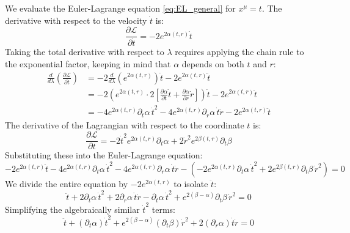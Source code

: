 \documentclass[11pt, a4paper]{report}
\begin{document}
We evaluate the Euler-Lagrange equation \eqref{eq:EL_general} for $x^\mu = t$. 
The derivative with respect to the velocity $\dot{t}$ is:
\begin{equation}
    \frac{\partial \mathcal{L}}{\partial \dot{t}} = -2e^{2\alpha(t,r)} \dot{t}
\end{equation}
Taking the total derivative with respect to $\lambda$ requires applying the chain rule to the exponential factor, keeping in mind that $\alpha$ depends on both $t$ and $r$:
\begin{align}
    \frac{d}{d\lambda} \left( \frac{\partial \mathcal{L}}{\partial \dot{t}} \right) &= -2 \frac{d}{d\lambda} \left( e^{2\alpha(t,r)} \right) \dot{t} - 2e^{2\alpha(t,r)} \ddot{t} \nonumber \\
    &= -2 \left( e^{2\alpha(t,r)} \cdot 2 \left[ \frac{\partial \alpha}{\partial t} \dot{t} + \frac{\partial \alpha}{\partial r} \dot{r} \right] \right) \dot{t} - 2e^{2\alpha(t,r)} \ddot{t} \nonumber \\
    &= -4e^{2\alpha(t,r)} \partial_t \alpha \, \dot{t}^2 - 4e^{2\alpha(t,r)} \partial_r \alpha \, \dot{t}\dot{r} - 2e^{2\alpha(t,r)} \ddot{t}
\end{align}
The derivative of the Lagrangian with respect to the coordinate $t$ is:
\begin{equation}
    \frac{\partial \mathcal{L}}{\partial t} = -2\dot{t}^2 e^{2\alpha(t,r)} \partial_t \alpha + 2\dot{r}^2 e^{2\beta(t,r)} \partial_t \beta
\end{equation}
Substituting these into the Euler-Lagrange equation:
\begin{equation}
    -2e^{2\alpha(t,r)} \ddot{t} - 4e^{2\alpha(t,r)} \partial_t \alpha \, \dot{t}^2 - 4e^{2\alpha(t,r)} \partial_r \alpha \, \dot{t}\dot{r} - \left( -2e^{2\alpha(t,r)} \partial_t \alpha \, \dot{t}^2 + 2e^{2\beta(t,r)} \partial_t \beta \, \dot{r}^2 \right) = 0
\end{equation}
We divide the entire equation by $-2e^{2\alpha(t,r)}$ to isolate $\ddot{t}$:
\begin{equation}
    \ddot{t} + 2\partial_t \alpha \, \dot{t}^2 + 2\partial_r \alpha \, \dot{t}\dot{r} - \partial_t \alpha \, \dot{t}^2 + e^{2(\beta - \alpha)} \partial_t \beta \, \dot{r}^2 = 0
\end{equation}
Simplifying the algebraically similar $\dot{t}^2$ terms:
\begin{equation}
    \ddot{t} + (\partial_t \alpha) \dot{t}^2 + e^{2(\beta - \alpha)} (\partial_t \beta) \dot{r}^2 + 2 (\partial_r \alpha) \dot{t}\dot{r} = 0 \label{eq:geo_t}
\end{equation}
\end{document}
